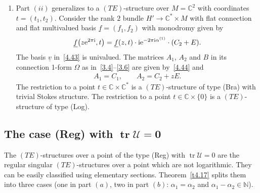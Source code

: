 \documentclass[pdftex]{sigma}%
\numberwithin{equation}{section}
\numberwithin{figure}{section}
\newcommand{\N}{{\mathbb N}}
\newcommand{\C}{{\mathbb C}}
\newcommand{\UU}{{\mathcal U}}
\newcommand{\uuuu}{\underline}
\DeclareMathOperator{\tr}{tr}
\begin{document}
\begin{Remarks}
\begin{enumerate}
\item[$(iii)$] Part $(ii)$ generalizes to a $(TE)$-structure over
$M=\C^2$ with coordinates $t=(t_1,t_2)$.
Consider the rank $2$ bundle $H'\to\C^*\times M$ with
flat connection and flat multivalued basis $\uuuu{f}=(f_1,f_2)$
with monodromy given by
\begin{gather*}%
\uuuu{f}\big(z{\rm e}^{2\pi {\rm i}},t\big)=\uuuu{f}(z,t)\cdot {\rm i}{\rm e}^{-2\pi {\rm i}\alpha^{(1)}}
\cdot (C_2+E).
\end{gather*}
The basis $\uuuu{v}$ in~\eqref{4.43} is univalued.
The matrices $A_1$, $A_2$ and $B$ in its connection 1-form
$\Omega$ as in~\eqref{3.4}--\eqref{3.6} are given
by~\eqref{4.44} and
\begin{gather*}%
A_1=C_1,\qquad
A_2=C_2+zE.
\end{gather*}
The restriction to a point $t\in \C\times\C^*$ is a
$(TE)$-structure of type (Bra) with trivial Stokes
structure.
The restriction to a point $t\in\C\times\{0\}$
is a $(TE)$-structure of type (Log).
\end{enumerate}
\end{Remarks}



\subsection[The case (Reg) with $\tr\UU=0$]
{The case (Reg) with $\boldsymbol{\tr\UU=0}$}\label{c4.5}

The $(TE)$-structures over a point of the type (Reg) with
$\tr\UU=0$ are the regular singular $(TE)$-structures
over a point which are not logarithmic.
They can be easily classified using elementary sections.
Theorem~\ref{t4.17} splits them into three cases
(one in part $(a)$, two in part $(b)$: $\alpha_1=\alpha_2$
and $\alpha_1-\alpha_2\in\N$).
\end{document}

